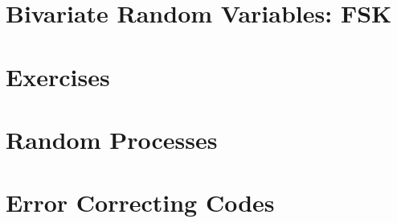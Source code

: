 \documentclass[journal]{IEEEtran}
\begin{document}
\section{Bivariate Random Variables: FSK}

\section{Exercises}

\section{Random Processes}

\section{Error Correcting Codes}


% 
\backmatter
\fi
\appendix

\end{document}
